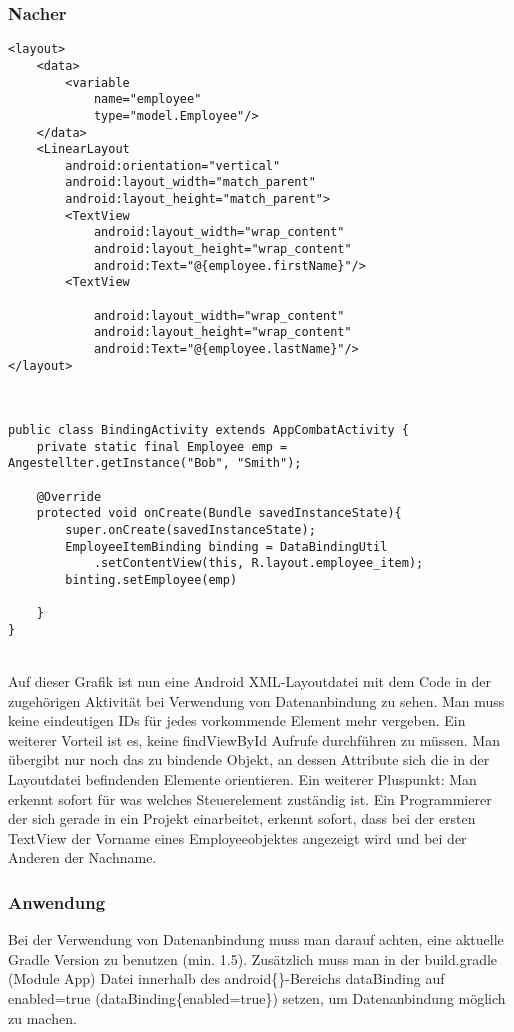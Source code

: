 \documentclass[FIPLY_base.tex]{subfiles}
\begin{document}
\newpage
\subsubsection{Nacher}

\begin{lstlisting}[caption={XML Datei nach dem Einsatz von Databinding.},label=DescriptiveLabel]
<layout>
	<data>
		<variable
			name="employee"
			type="model.Employee"/>
	</data>
	<LinearLayout
		android:orientation="vertical"
		android:layout_width="match_parent"
		android:layout_height="match_parent">
		<TextView
			android:layout_width="wrap_content"
			android:layout_height="wrap_content"
			android:Text="@{employee.firstName}"/>
		<TextView
	
			android:layout_width="wrap_content"
			android:layout_height="wrap_content"
			android:Text="@{employee.lastName}"/>
</layout>	
\end{lstlisting}
\ \\

\begin{lstlisting}[caption={Die Activity vor dem Einsatz von DataBinding.},label=DescriptiveLabel]
public class BindingActivity extends AppCombatActivity {
	private static final Employee emp = Angestellter.getInstance("Bob", "Smith");

	@Override
	protected void onCreate(Bundle savedInstanceState){
		super.onCreate(savedInstanceState);
		EmployeeItemBinding binding = DataBindingUtil
			.setContentView(this, R.layout.employee_item);
		binting.setEmployee(emp)

	}
}
\end{lstlisting}
\ \\

Auf dieser Grafik ist nun eine Android XML-Layoutdatei mit dem Code in der zugehörigen Aktivität bei Verwendung von Datenanbindung zu sehen. Man muss keine eindeutigen IDs für jedes vorkommende Element mehr vergeben. Ein weiterer Vorteil ist es, keine findViewById Aufrufe durchführen zu müssen. Man übergibt nur noch das zu bindende Objekt, an dessen Attribute sich die in der Layoutdatei befindenden Elemente orientieren. 
Ein weiterer Pluspunkt: Man erkennt sofort für was welches Steuerelement zuständig ist. Ein Programmierer der sich gerade in ein Projekt einarbeitet, erkennt sofort, dass bei der ersten TextView der Vorname eines Employeeobjektes angezeigt wird und bei der Anderen der Nachname.
\ \\

\subsubsection{Anwendung}
Bei der Verwendung von Datenanbindung muss man darauf achten, eine aktuelle Gradle Version zu benutzen (min. 1.5). Zusätzlich muss man in der build.gradle (Module App) Datei innerhalb des android\{\}-Bereichs dataBinding auf enabled=true (dataBinding\{enabled=true\}) setzen, um Datenanbindung möglich zu machen.
\end{document}
